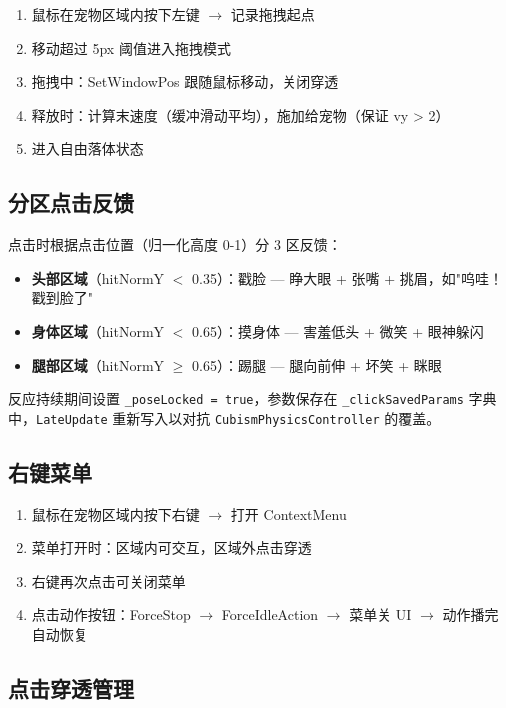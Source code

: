 \documentclass[12pt,a4paper]{ctexart}
\begin{document}
\begin{enumerate}
    \item 鼠标在宠物区域内按下左键 $\to$ 记录拖拽起点
    \item 移动超过 5px 阈值进入拖拽模式
    \item 拖拽中：SetWindowPos 跟随鼠标移动，关闭穿透
    \item 释放时：计算末速度（缓冲滑动平均），施加给宠物（保证 vy > 2）
    \item 进入自由落体状态
\end{enumerate}

\subsection{分区点击反馈}

点击时根据点击位置（归一化高度 0-1）分 3 区反馈：

\begin{itemize}
    \item \textbf{头部区域}（hitNormY $<$ 0.35）：戳脸 — 睁大眼 + 张嘴 + 挑眉，如"呜哇！戳到脸了"
    \item \textbf{身体区域}（hitNormY $<$ 0.65）：摸身体 — 害羞低头 + 微笑 + 眼神躲闪
    \item \textbf{腿部区域}（hitNormY $\geq$ 0.65）：踢腿 — 腿向前伸 + 坏笑 + 眯眼
\end{itemize}

反应持续期间设置 \texttt{\_poseLocked = true}，参数保存在 \texttt{\_clickSavedParams} 字典中，\texttt{LateUpdate} 重新写入以对抗 \texttt{CubismPhysicsController} 的覆盖。

\subsection{右键菜单}

\begin{enumerate}
    \item 鼠标在宠物区域内按下右键 $\to$ 打开 ContextMenu
    \item 菜单打开时：区域内可交互，区域外点击穿透
    \item 右键再次点击可关闭菜单
    \item 点击动作按钮：ForceStop $\to$ ForceIdleAction $\to$ 菜单关 UI $\to$ 动作播完自动恢复
\end{enumerate}

\subsection{点击穿透管理}
\end{document}
